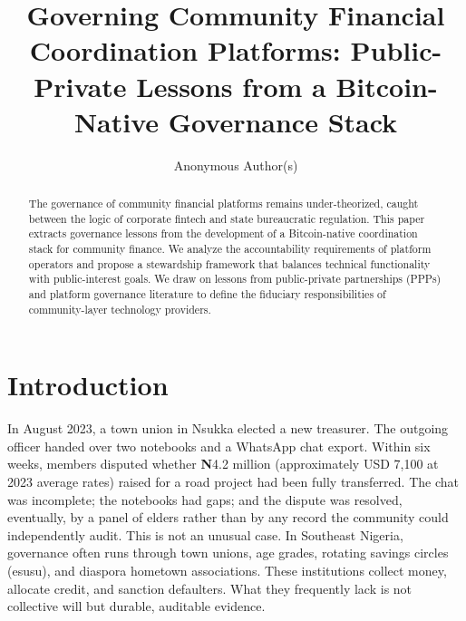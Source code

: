 \documentclass[sigconf,anonymous]{acmart}
\begin{document}
\title{Governing Community Financial Coordination Platforms: Public-Private Lessons from a Bitcoin-Native Governance Stack}

\author{Anonymous Author(s)}

\begin{abstract}
The governance of community financial platforms remains under-theorized, caught between the logic of corporate fintech and state bureaucratic regulation. This paper extracts governance lessons from the development of a Bitcoin-native coordination stack for community finance. We analyze the accountability requirements of platform operators and propose a stewardship framework that balances technical functionality with public-interest goals. We draw on lessons from public-private partnerships (PPPs) and platform governance literature to define the fiduciary responsibilities of community-layer technology providers.
\end{abstract}



\maketitle

\section{Introduction}

In August 2023, a town union in Nsukka elected a new treasurer. The outgoing officer handed over two notebooks and a WhatsApp chat export. Within six weeks, members disputed whether \textbf{N}4.2 million (approximately USD 7,100 at 2023 average rates) raised for a road project had been fully transferred. The chat was incomplete; the notebooks had gaps; and the dispute was resolved, eventually, by a panel of elders rather than by any record the community could independently audit. This is not an unusual case. In Southeast Nigeria, governance often runs through town unions, age grades, rotating savings circles (esusu), and diaspora hometown associations. These institutions collect money, allocate credit, and sanction defaulters. What they frequently lack is not collective will but durable, auditable evidence.
\end{document}
